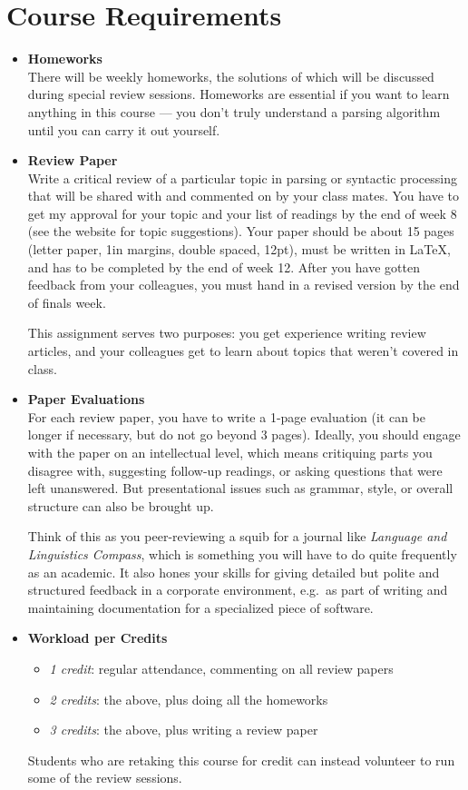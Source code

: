 \section{Course Requirements}
\begin{itemize}
    \item \textbf{Homeworks}\\
        There will be weekly homeworks, the solutions of which will be discussed during special review sessions.
        Homeworks are essential if you want to learn anything in this course --- you don't truly understand a parsing algorithm until you can carry it out yourself.
    \item \textbf{Review Paper}\\
        Write a critical review of a particular topic in parsing or syntactic processing that will be shared with and commented on by your class mates.
        You have to get my approval for your topic and your list of readings by the end of week 8 (see the website for topic suggestions).
        Your paper should be about 15 pages (letter paper, 1in margins, double spaced, 12pt), must be written in \LaTeX, and has to be completed by the end of week 12.
        After you have gotten feedback from your colleagues, you must hand in a revised version by the end of finals week.

        This assignment serves two purposes: you get experience writing review articles, and your colleagues get to learn about topics that weren't covered in class.
    \item \textbf{Paper Evaluations}\\
        For each review paper, you have to write a 1-page evaluation (it can be longer if necessary, but do not go beyond 3 pages).
        Ideally, you should engage with the paper on an intellectual level, which means critiquing parts you disagree with, suggesting follow-up readings, or asking questions that were left unanswered.
        But presentational issues such as grammar, style, or overall structure can also be brought up.

        Think of this as you peer-reviewing a squib for a journal like \emph{Language and Linguistics Compass}, which is something you will have to do quite frequently as an academic.
        It also hones your skills for giving detailed but polite and structured feedback in a corporate environment, e.g.\ as part of writing and maintaining documentation for a specialized piece of software.
    \item \textbf{Workload per Credits}
        \begin{itemize}
            \item \emph{1 credit}: regular attendance, commenting on all review papers
            \item \emph{2 credits}: the above, plus doing all the homeworks
            \item \emph{3 credits}: the above, plus writing a review paper
        \end{itemize}
        Students who are retaking this course for credit can instead volunteer to run some of the review sessions.
\end{itemize}

